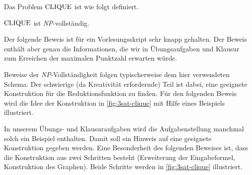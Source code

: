 \begin{Def}[$\CLIQUE$]
    Das Problem $\CLIQUE$ ist wie folgt definiert.
    \begin{center}
    \end{center}
\end{Def}
\begin{Satz}[name={[$\CLIQUE$ ist \textit{NP}-vollständig]}]
	$\CLIQUE$ ist \textit{NP}-vollständig.
\end{Satz}
\begin{Bemerkung}
 Der folgende Beweis ist für ein Vorlesungsskript sehr knapp gehalten.
 Der Beweis enthält aber genau die Informationen, die wir in Übungsaufgaben und Klausur zum Erreichen der maximalen Punktzahl erwarten würde.
 
 Beweise der \textit{NP}-Vollständigkeit folgen typischerweise dem hier verwendeten Schema.
 Der schwierige (da Kreativität erfordernde) Teil ist dabei, eine geeignete Konstruktion für die Reduktionsfunktion zu finden.
 Für den folgenden Beweis wird die Idee der Konstruktion in \autoref{fig:3sat-clique} mit Hilfe eines Beispiels illustriert.
 
 In unserem Übungs- und Klausuraufgaben wird die Aufgabenstellung manchmal solch ein Beispiel enthalten.
 Damit soll ein Hinweis auf eine geeignete Konstruktion gegeben werden.
 Eine Besonderheit des folgenden Beweises ist, dass die Konstruktion aus zwei Schritten besteht (Erweiterung der Eingabeformel, Konstruktion des Graphen). Beide Schritte werden in \autoref{fig:3sat-clique} illustriert.
\end{Bemerkung}

